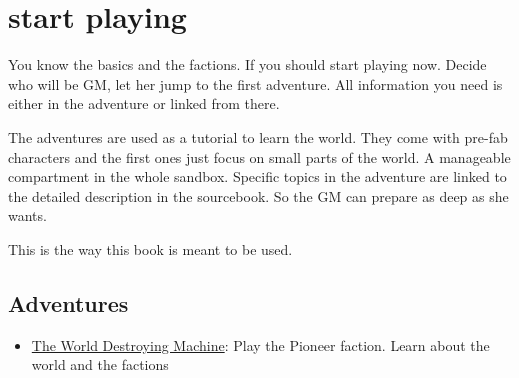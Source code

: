 \chapter{start playing}

You know the basics and the factions. If you should start playing now. Decide who will be GM, let her jump to the first adventure.
All information you need is either in the adventure or linked from there.

The adventures are used as a tutorial to learn the world. They come with pre-fab characters and the first ones just focus on small parts of the world. A manageable compartment in the whole sandbox.
Specific topics in the adventure are linked to the detailed description in the sourcebook. So the GM can prepare as deep as she wants.

This is the way this book is meant to be used.

\section{Adventures}

\begin{itemize}
\item \hyperref[ch:the world destroying machine]{The World Destroying Machine}: Play the Pioneer faction. Learn about the world and the factions
\end{itemize}